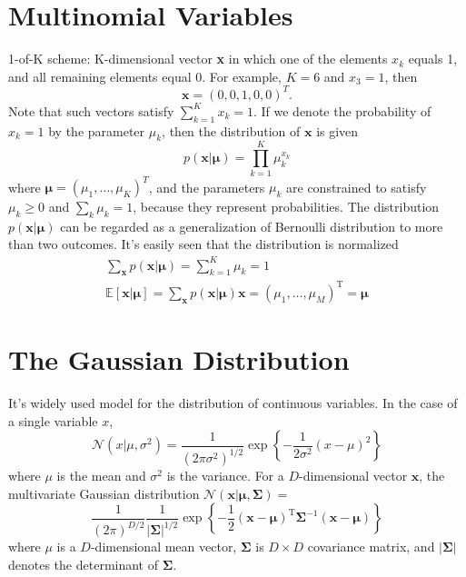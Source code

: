 \documentclass[5p,sort&compress]{elsarticle}
\begin{document}
\section{Multinomial Variables}

1-of-K scheme: K-dimensional vector \textbf{x} in which one of the elements $x_k$ equals 1, and all remaining elements equal 0. For example, $K=6$ and $x_3 =1 $, then
\begin{equation}
    \mathbf{x} = (0, 0, 1, 0, 0)^T.
\end{equation}
Note that such vectors satisfy $\sum_{k=1}^K x_k =1$. If we denote the probability of $x_k=1$ by the parameter $\mu_k$, then the distribution of $\mathbf{x}$ is given
\begin{equation}
p(\mathbf{x} | \boldsymbol{\mu})=\prod_{k=1}^{K} \mu_{k}^{x_{k}}
\end{equation}
where $\boldsymbol{\mu} = (\mu_1, \ldots, \mu_K)^T$, and the parameters $\mu_k$ are constrained to satisfy $\mu_k \geq 0$ and $\sum_k \mu_k =1$, because they represent probabilities. The distribution $p(\mathbf{x} | \boldsymbol{\mu})$ can be regarded as a generalization of Bernoulli distribution to more than two outcomes. It's easily seen that the distribution is normalized
\begin{equation}
\begin{aligned}{\sum_{\mathbf{x}} p(\mathbf{x} | \boldsymbol{\mu})=\sum_{k=1}^{K} \mu_{k}=1} \\ {\mathbb{E}[\mathbf{x} | \boldsymbol{\mu}]=\sum_{\mathbf{x}} p(\mathbf{x} | \boldsymbol{\mu}) \mathbf{x}=\left(\mu_{1}, \ldots, \mu_{M}\right)^{\mathrm{T}}=\boldsymbol{\mu}}\end{aligned}
\end{equation}


\section{The Gaussian Distribution}
It's widely used model for the distribution of continuous variables. In the case of a single variable $x$,
\begin{equation}
\mathcal{N}\left(x | \mu, \sigma^{2}\right)=\frac{1}{\left(2 \pi \sigma^{2}\right)^{1 / 2}} \exp \left\{-\frac{1}{2 \sigma^{2}}(x-\mu)^{2}\right\}
\end{equation}
where $\mu$ is the mean and $\sigma^2$ is the variance. For a $D$-dimensional vector $\boldsymbol{x}$, the multivariate Gaussian distribution $\mathcal{N}(\mathbf{x} | \boldsymbol{\mu}, \mathbf{\Sigma}) = $
\begin{equation}
 \frac{1}{(2 \pi)^{D / 2}} \frac{1}{|\mathbf{\Sigma}|^{1 / 2}} \exp \left\{-\frac{1}{2}(\mathbf{x}-\boldsymbol{\mu})^{\mathrm{T}} \mathbf{\Sigma}^{-1}(\mathbf{x}-\boldsymbol{\mu})\right\}
\end{equation}
where $\mu$ is a $D$-dimensional mean vector, $\mathbf{\Sigma}$ is $D \times D$ covariance matrix, and $|\mathbf{\Sigma}|$ denotes the determinant of $\mathbf{\Sigma}$.
\end{document}
